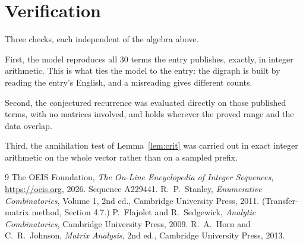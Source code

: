 \documentclass[11pt,a4paper]{article}
\theoremstyle{plain}
\theoremstyle{definition}
\begin{document}
\section{Verification}

Three checks, each independent of the algebra above.

First, the model reproduces all $30$ terms the entry publishes, exactly, in integer
arithmetic. This is what ties the model to the entry: the digraph is built by reading the
entry's English, and a misreading gives different counts.

Second, the conjectured recurrence was evaluated directly on those published terms, with no
matrices involved, and holds wherever the proved range and the data overlap.

Third, the annihilation test of Lemma~\ref{lem:crit} was carried out in exact integer
arithmetic on the whole vector rather than on a sampled prefix.

\begin{thebibliography}{9}
 The OEIS Foundation, \emph{The On-Line Encyclopedia of Integer
Sequences}, \url{https://oeis.org}, 2026. Sequence A229441.
 R.~P.~Stanley, \emph{Enumerative Combinatorics}, Volume 1, 2nd ed.,
Cambridge University Press, 2011. (Transfer-matrix method, Section 4.7.)
 P.~Flajolet and R.~Sedgewick, \emph{Analytic Combinatorics}, Cambridge
University Press, 2009.
 R.~A.~Horn and C.~R.~Johnson, \emph{Matrix Analysis}, 2nd ed., Cambridge
University Press, 2013.
\end{thebibliography}
\end{document}
